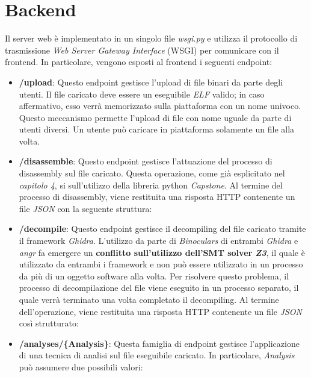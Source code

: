 \documentclass[../main.tex]{subfiles}
\begin{document}
\section{Backend}
Il server web è implementato in un singolo file \textit{wsgi.py} e utilizza il protocollo di trasmissione \textit{Web Server Gateway Interface} (WSGI)
per comunicare con il frontend.
In particolare, vengono esposti al frontend i seguenti endpoint:
\begin{itemize}
    \item \textbf{/upload}: Questo endpoint gestisce l'upload di file binari da parte degli utenti.
    Il file caricato deve essere un eseguibile \textit{ELF} valido; in caso affermativo, esso verrà memorizzato
    sulla piattaforma con un nome univoco. Questo meccanismo permette l'upload di file con nome uguale da parte
    di utenti diversi. Un utente può caricare in piattaforma solamente un file alla volta.
    \item \textbf{/disassemble}: Questo endpoint gestisce l'attuazione del processo di disassembly sul file caricato.
    Questa operazione, come già esplicitato nel \textit{capitolo 4}, si sull'utilizzo della libreria python \textit{Capstone}.
    Al termine del processo di disassembly, viene restituita una risposta HTTP contenente un file \textit{JSON} con la seguente struttura:
    
    \item \textbf{/decompile}: Questo endpoint gestisce il decompiling del file caricato tramite il framework \textit{Ghidra}.
    L'utilizzo da parte di \textit{Binoculars} di entrambi \textit{Ghidra} e \textit{angr} fa emergere un \textbf{conflitto sull'utilizzo dell'SMT solver \textit{Z3}}, il quale
    è utilizzato da entrambi i framework e non può essere utilizzato in un processo da più di un oggetto software alla volta.
    Per risolvere questo problema, il processo di decompilazione del file viene eseguito in un processo separato, il quale verrà terminato una volta completato
    il decompiling. Al termine dell'operazione, viene restituita una risposta HTTP contenente un file \textit{JSON} così strutturato:
    
    \item \textbf{/analyses/\{Analysis\}}: Questa famiglia di endpoint gestisce l'applicazione di una tecnica di analisi sul file eseguibile caricato.
    In particolare, \textit{Analysis} può assumere due possibili valori:

\end{itemize}
\end{document}
